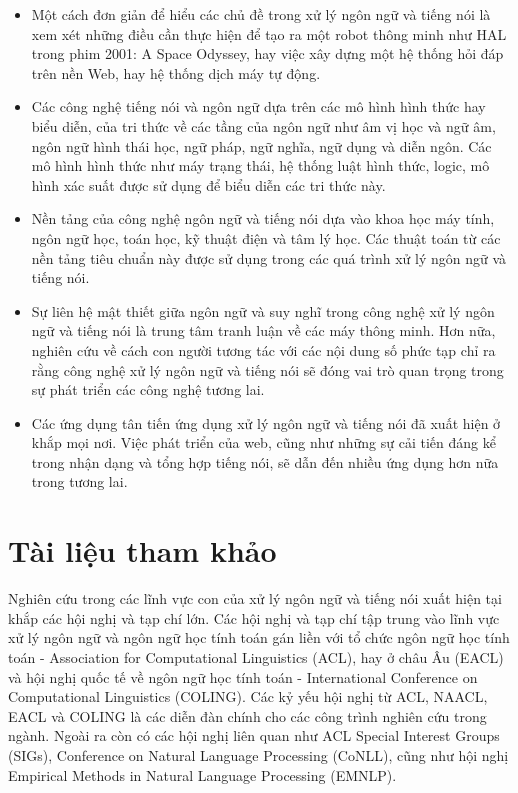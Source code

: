 \begin{itemize}
  \item Một cách đơn giản để hiểu các chủ đề trong xử lý ngôn ngữ và tiếng nói là xem xét những điều cần thực hiện để tạo ra một robot thông minh như HAL trong phim 2001: A Space Odyssey, hay việc xây dựng một hệ thống hỏi đáp trên nền Web, hay hệ thống dịch máy tự động.
  \item Các công nghệ tiếng nói và ngôn ngữ dựa trên các mô hình hình thức hay biểu diễn, của tri thức về các tầng của ngôn ngữ như âm vị học và ngữ âm, ngôn ngữ hình thái học, ngữ pháp, ngữ nghĩa, ngữ dụng và diễn ngôn. Các mô hình hình thức như máy trạng thái, hệ thống luật hình thức, logic, mô hình xác suất được sử dụng để biểu diễn các tri thức này.
  \item Nền tảng của công nghệ ngôn ngữ và tiếng nói dựa vào khoa học máy tính, ngôn ngữ học, toán học, kỹ thuật điện và tâm lý học. Các thuật toán từ các nền tảng tiêu chuẩn này được sử dụng trong các quá trình xử lý ngôn ngữ và tiếng nói.
  \item Sự liên hệ mật thiết giữa ngôn ngữ và suy nghĩ trong công nghệ xử lý ngôn ngữ và tiếng nói là trung tâm tranh luận về các máy thông minh. Hơn nữa, nghiên cứu về cách con người tương tác với các nội dung số phức tạp chỉ ra rằng công nghệ xử lý ngôn ngữ và tiếng nói sẽ đóng vai trò quan trọng trong sự phát triển các công nghệ tương lai.
  \item Các ứng dụng tân tiến ứng dụng xử lý ngôn ngữ và tiếng nói đã xuất hiện ở khắp mọi nơi. Việc phát triển của web, cũng như những sự cải tiến đáng kể trong nhận dạng và tổng hợp tiếng nói, sẽ dẫn đến nhiều ứng dụng hơn nữa trong tương lai.
\end{itemize}

\section{Tài liệu tham khảo}

Nghiên cứu trong các lĩnh vực con của xử lý ngôn ngữ và tiếng nói xuất hiện tại khắp các hội nghị và tạp chí lớn. Các hội nghị và tạp chí tập trung vào lĩnh vực xử lý ngôn ngữ và ngôn ngữ học tính toán gán liền với tổ chức ngôn ngữ học tính toán - Association for Computational Linguistics (ACL), hay ở châu Âu (EACL) và hội nghị quốc tế về ngôn ngữ học tính toán - International Conference on Computational Linguistics (COLING). Các kỷ yếu hội nghị từ ACL, NAACL, EACL và COLING là các diễn đàn chính cho các công trình nghiên cứu trong ngành. Ngoài ra còn có các hội nghị liên quan như ACL Special Interest Groups (SIGs), Conference on Natural Language Processing (CoNLL), cũng như hội nghị Empirical Methods in Natural Language Processing (EMNLP).

